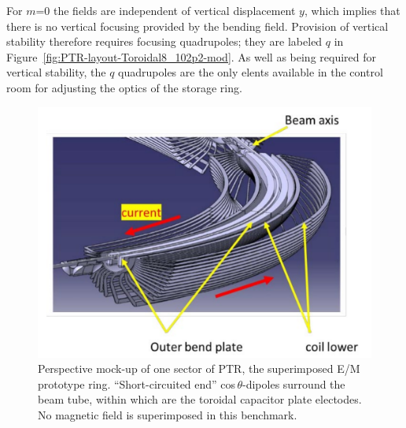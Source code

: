 \documentclass[12pt]{article}
\begin{document}
For $m$=0 the fields are independent of vertical displacement $y$,
which implies that there is no vertical focusing provided by the bending field.
Provision of vertical stability therefore requires 
focusing quadrupoles; they are labeled $q$ in Figure~\ref{fig:PTR-layout-Toroidal8_102p2-mod}.
As well as being required for vertical stability, the $q$ quadrupoles are the only elents 
available in the control room for adjusting the optics of the storage ring.

%
\begin{figure}
\centering
\includegraphics[scale=0.45]{pdf/Fig-5-bender.pdf}
\caption{\label{fig:SectorPerspective}Perspective mock-up of one sector of PTR, the superimposed 
E/M prototype ring. ``Short-circuited end'' cos\,$\theta$-dipoles surround the beam tube, within 
which are the toroidal capacitor plate electodes.  No magnetic field is superimposed in this benchmark.}
\end{figure}
%
\end{document}
